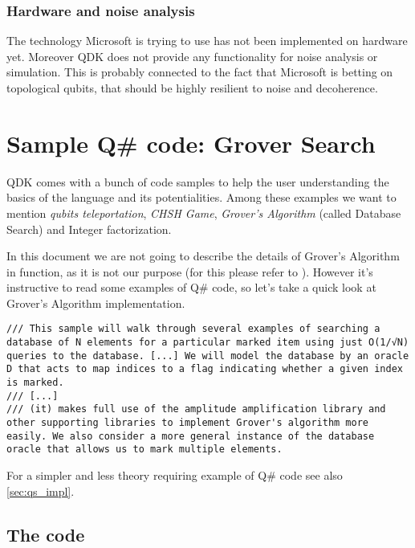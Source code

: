 \subsubsection{Hardware and noise analysis}

The technology Microsoft is trying to use has not been implemented on hardware yet. Moreover QDK does not provide any functionality for noise analysis or simulation. This is probably connected to the fact that Microsoft is betting on topological qubits, that should be highly resilient to noise and decoherence.

\section{Sample Q\# code: Grover Search}
\label{sec:QSgrover}

\lstset{
	language=qsharp,
	basicstyle=\scriptsize
}

QDK comes with a bunch of code samples to help the user understanding the basics of the language and its potentialities. Among these examples we want to mention \textit{qubits teleportation}, \textit{CHSH Game}, \textit{Grover's Algorithm} (called Database Search) and Integer factorization.

\bigskip

In this document we are not going to describe the details of Grover's Algorithm in function, as it is not our purpose (for this please refer to \cite{Grover:1996:FQM:237814.237866}). However it's instructive to read some examples of Q\# code, so let's take a quick look at Grover's Algorithm implementation.

\begin{lstlisting}
/// This sample will walk through several examples of searching a database of N elements for a particular marked item using just O(1/√N) queries to the database. [...] We will model the database by an oracle D that acts to map indices to a flag indicating whether a given index is marked.
/// [...]
/// (it) makes full use of the amplitude amplification library and other supporting libraries to implement Grover's algorithm more easily. We also consider a more general instance of the database oracle that allows us to mark multiple elements.
\end{lstlisting}

For a simpler and less theory requiring example of Q\# code see also \cref{sec:qs_impl}.

\subsection{The code}

